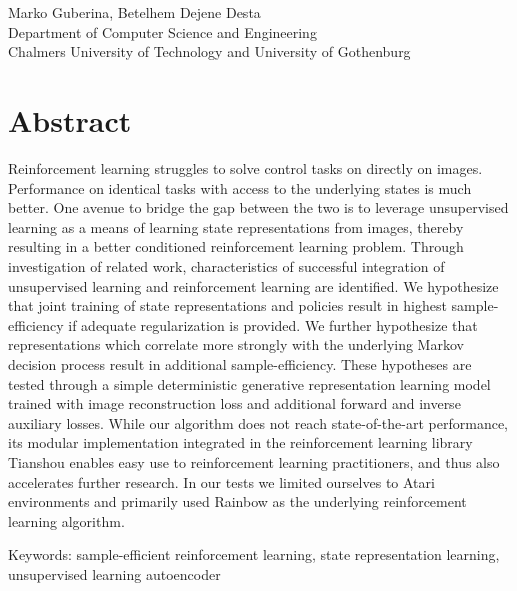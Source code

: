 \oneLineTitle\\
\oneLineSubtitle\\
Marko Guberina,
Betelhem Dejene Desta\\
Department of Computer Science and Engineering\\
Chalmers University of Technology and University of Gothenburg\setlength{\parskip}{0.5cm}

\thispagestyle{plain}			%
\setlength{\parskip}{0pt plus 1.0pt}
\section*{Abstract}
Reinforcement learning struggles to solve control tasks on directly on images.
Performance on identical tasks with access to the underlying states is much better.
One avenue to bridge the gap between the two is to leverage unsupervised learning
as a means of learning state representations from images, thereby resulting
in a better conditioned reinforcement learning problem.
Through investigation of related work, characteristics of successful 
integration of unsupervised learning and reinforcement learning are identified.
We hypothesize that joint training of state representations and policies
result in highest sample-efficiency if adequate regularization is provided.
We further hypothesize that representations which correlate more strongly
with the underlying Markov decision process result in additional sample-efficiency.
These hypotheses are tested through a simple deterministic generative 
representation learning model trained with image reconstruction loss
and additional forward and inverse auxiliary losses.
While our algorithm does not reach state-of-the-art performance,
its modular implementation integrated in the reinforcement learning library Tianshou
enables easy use to reinforcement learning practitioners,
and thus also accelerates further research.
In our tests we limited ourselves to Atari environments
and primarily used Rainbow as the underlying reinforcement learning algorithm.

\vfill
Keywords: sample-efficient reinforcement learning, state representation learning, unsupervised learning
autoencoder


\newpage				%
\thispagestyle{empty}
\mbox{}
